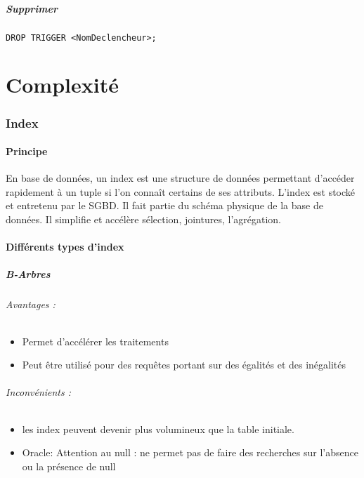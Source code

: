 \documentclass[10pt,a4paper,twoside]{article}
\begin{document}
\subsubsection{Supprimer}
\begin{verbatim}
DROP TRIGGER <NomDeclencheur>;
\end{verbatim}

\newpage
\part{Complexité}
\section{Index}
\subsection{Principe}
En base de données, un index est une structure de données permettant d'accéder rapidement à un tuple si l'on connaît certains de ses attributs. L'index est stocké et entretenu par le SGBD. Il fait partie du schéma physique de la base de données. Il simplifie et accélère sélection, jointures, l'agrégation.

\subsection{Différents types d'index}
\subsubsection{B-Arbres}
\paragraph{Avantages :}
\begin{itemize}
\item Permet d'accélérer les traitements
\item Peut être utilisé pour des requêtes portant sur des égalités et des inégalités
\end{itemize}
\paragraph{Inconvénients :}
\begin{itemize}
\item les index peuvent devenir plus volumineux que la table initiale.
\item Oracle: Attention au null : ne permet pas de faire des recherches sur l’absence ou la présence de null
\end{itemize}
\end{document}
